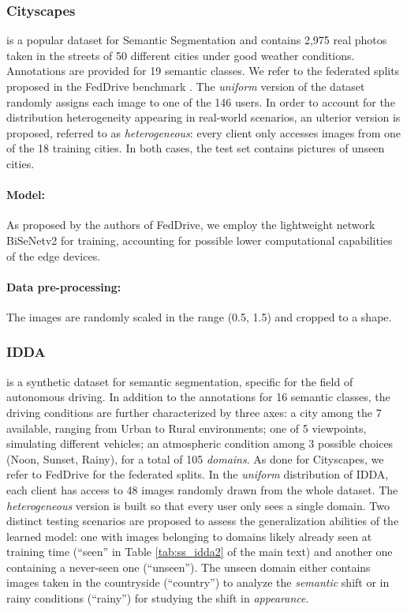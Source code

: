 \subsubsection{Cityscapes} \cite{cordts2016cityscapes} is a popular dataset for Semantic Segmentation and contains 2,975 real photos taken in the streets of 50 different cities under good weather conditions. Annotations are provided for 19 semantic classes. We refer to the federated splits proposed in the FedDrive benchmark \cite{fantauzzo2022feddrive}. The \textit{uniform} version of the dataset randomly assigns each image to one of the 146 users. In order to account for the distribution heterogeneity appearing in real-world scenarios, an ulterior version is proposed, referred to as \textit{heterogeneous}: every client only accesses images from one of the 18 training cities. In both cases, the test set contains pictures of unseen cities.
\paragraph{Model:} As proposed by the authors of FedDrive, we employ the lightweight network BiSeNetv2 \cite{yu2021bisenet} for training, accounting for possible lower computational capabilities of the edge devices. 
\paragraph{Data pre-processing:} The images are randomly scaled in the range (0.5, 1.5) and cropped to a  shape. 
 
\subsubsection{IDDA} \cite{alberti2020idda} is a synthetic dataset for semantic segmentation, specific for the field of autonomous driving. In addition to the annotations for 16 semantic classes, the driving conditions are further characterized by three axes: a city among the 7 available, ranging from Urban to Rural environments; one of 5 viewpoints, simulating different vehicles; an atmospheric condition among 3 possible choices (Noon, Sunset, Rainy), for a total of 105\textit{ domains}. As done for Cityscapes, we refer to FedDrive \cite{fantauzzo2022feddrive} for the federated splits. In the \textit{uniform} distribution of IDDA, each client has access to 48 images randomly drawn from the whole dataset. The \textit{heterogeneous} version is built so that every user only sees a single domain. Two distinct testing scenarios are proposed to assess the generalization abilities of the learned model: one with images belonging to domains likely already seen at training time (``seen'' in Table \ref{tab:ss_idda2} of the main text) and another one containing a never-seen one (``unseen''). The unseen domain either contains images taken in the countryside (``country'') to analyze the \textit{semantic} shift or in rainy conditions (``rainy'') for studying the shift in \textit{appearance}.

